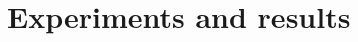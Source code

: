 \documentclass{article}
\theoremstyle{definition}
\theoremstyle{definition}
\theoremstyle{remark}
\theoremstyle{mythmstyle}
\begin{document}




\section{Experiments and results}\label{results}
\end{document}
